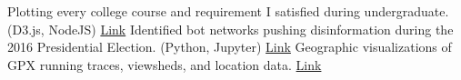 	\begin{projects}
			{Plotting every college course and requirement I satisfied during undergraduate. (D3.js, NodeJS)}
			{\href{https://raw.githubusercontent.com/ryan-p-larson/ryan-p-larson/master/src/images/college.png}{Link}}
			{Identified bot networks pushing disinformation during the 2016 Presidential Election. (Python, Jupyter)}
			{\href{https://github.com/ryan-p-larson/polititweets}{Link}}
			{Geographic visualizations of GPX running traces, viewsheds, and location data.}
			{\href{https://github.com/ryan-p-larson/city-maps}{Link}}
	\end{projects}